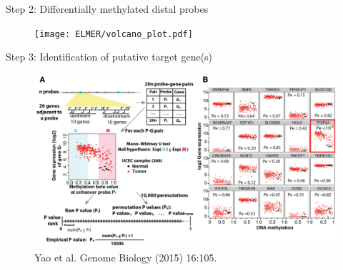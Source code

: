 \documentclass[slidestop,compress,11pt,xcolor=dvipsnames]{beamer}
\begin{document}

\begin{frame}{Step 2: Differentially methylated distal probes}
 \begin{figure}
  \centering
  \texttt{[image: ELMER/volcano\_plot.pdf]}
 \end{figure}
\end{frame}

\begin{frame}{Step 3: Identification of putative target gene(s)}
 \vspace*{-0.3cm}
 \begin{figure}
  \centering
  \includegraphics[width=1.0\linewidth]{ELMER/pair.png}{\tiny{\\Yao et al. Genome Biology (2015) 16:105.}}
 \end{figure}
\end{frame}



\end{document}
